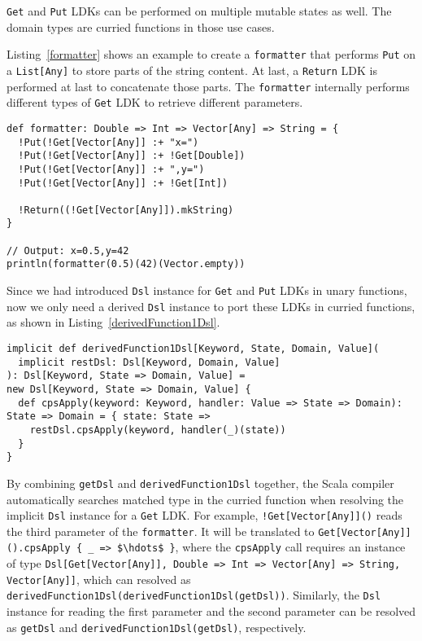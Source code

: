 \lstinline{Get} and \lstinline{Put} LDKs can be performed on multiple mutable states as well. The domain types are curried functions in those use cases.

Listing~\ref{formatter} shows an example to create a \lstinline{formatter} that performs \lstinline{Put} on a \lstinline{List[Any]} to store parts of the string content. At last, a \lstinline{Return} LDK is performed at last to concatenate those parts. The \lstinline{formatter} internally performs different types of \lstinline{Get} LDK to retrieve different parameters.

\begin{lstlisting}[caption={Using \lstinline{Get} and \lstinline{Put} in a curried function},label={formatter}]
def formatter: Double => Int => Vector[Any] => String = {
  !Put(!Get[Vector[Any]] :+ "x=")
  !Put(!Get[Vector[Any]] :+ !Get[Double])
  !Put(!Get[Vector[Any]] :+ ",y=")
  !Put(!Get[Vector[Any]] :+ !Get[Int])

  !Return((!Get[Vector[Any]]).mkString)
}

// Output: x=0.5,y=42
println(formatter(0.5)(42)(Vector.empty))
\end{lstlisting}

Since we had introduced \lstinline{Dsl} instance for \lstinline{Get} and \lstinline{Put} LDKs in unary functions, now we only need a derived \lstinline{Dsl} instance to port these LDKs in curried functions, as shown in Listing~\ref{derivedFunction1Dsl}.

\begin{lstlisting}[caption={Derived \lstinline{Dsl} instance in a curried function},label={derivedFunction1Dsl}]
implicit def derivedFunction1Dsl[Keyword, State, Domain, Value](
  implicit restDsl: Dsl[Keyword, Domain, Value]
): Dsl[Keyword, State => Domain, Value] =
new Dsl[Keyword, State => Domain, Value] {
  def cpsApply(keyword: Keyword, handler: Value => State => Domain): State => Domain = { state: State =>
    restDsl.cpsApply(keyword, handler(_)(state))
  }
}
\end{lstlisting}

By combining \lstinline{getDsl} and \lstinline{derivedFunction1Dsl} together, the Scala compiler automatically searches matched type in the curried function when resolving the implicit \lstinline{Dsl} instance for a \lstinline{Get} LDK. For example, \lstinline{!Get[Vector[Any]]()} reads the third parameter of the \lstinline{formatter}. It will be translated to \lstinline[mathescape=true]|Get[Vector[Any]]().cpsApply { _ => $\hdots$ }|, where the \lstinline{cpsApply} call requires an instance of type \lstinline{Dsl[Get[Vector[Any]], Double => Int => Vector[Any] => String, Vector[Any]]}, which can resolved as \lstinline{derivedFunction1Dsl(derivedFunction1Dsl(getDsl))}. Similarly, the \lstinline{Dsl} instance for reading the first parameter and the second parameter can be resolved as \lstinline{getDsl} and \lstinline{derivedFunction1Dsl(getDsl)}, respectively.

